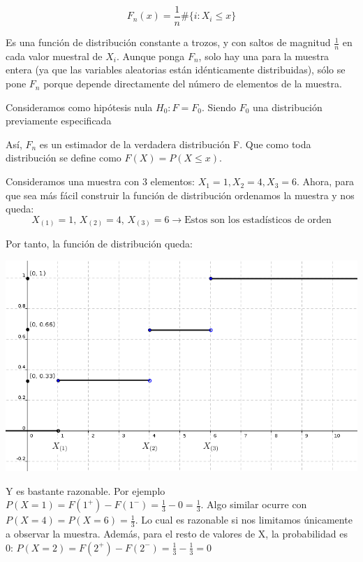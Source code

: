 \documentclass[palatino,nochap]{apuntes}
\begin{document}
$$ F_n(x)=\frac{1}{n}\#\{i: X_i \leq x\} $$

Es una función de distribución constante a trozos, y con saltos de magnitud $\frac{1}{n}$ en cada valor muestral de $X_i$. Aunque ponga $F_n$, solo hay una para la muestra entera (ya que las variables aleatorias están idénticamente distribuidas), sólo se pone $F_n$ porque depende directamente del número de elementos de la muestra.

Consideramos como hipótesis nula $H_0: F=F_0$. Siendo $F_0$ una distribución previamente especificada

Así, $F_n$ es un estimador de la verdadera distribución F. Que como toda distribución se define como $F(X)=P(X\leq x)$.

\begin{example}
Consideramos una muestra con 3 elementos: $X_1=1, X_2=4, X_3=6$. Ahora, para que sea más fácil construir la función de distribución ordenamos la muestra y nos queda:
$$ X_{(1)}=1 \text{, }X_{(2)}=4 \text{, }X_{(3)}=6 \rightarrow \text{Estos son los estadísticos de orden}$$

Por tanto, la función de distribución queda:

\includegraphics[scale=0.5]{img/contrasteks.png}

Y es bastante razonable. Por ejemplo $P(X=1) = F(1^+)-F(1^-)=\frac{1}{3}-0=\frac{1}{3}$. Algo similar ocurre con $P(X=4) = P(X=6) = \frac{1}{3}$. Lo cual es razonable si nos limitamos únicamente a observar la muestra. Además, para el resto de valores de X, la probabilidad es 0: $P(X=2)=F(2^+)-F(2^-) = \frac{1}{3}-\frac{1}{3}=0$
\end{example}
\end{document}
